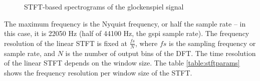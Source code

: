 \documentclass[letter,12pt]{article}
\begin{document}
\begin{figure}[ht]
	\vspace{-1em}
	\centering
	\hspace{0.35em}
	\hspace{0.35em}
	\caption{STFT-based spectrograms of the glockenspiel signal}
	\label{fig:glockspecs}
\end{figure}

The maximum frequency is the Nyquist frequency, or half the sample rate -- in this case, it is 22050 Hz (half of 44100 Hz, the gspi sample rate). The frequency resolution of the linear STFT is fixed at $\frac{\mathit{fs}}{N}$, where $\mathit{fs}$ is the sampling frequency or sample rate, and $N$ is the number of output bins of the DFT. The time resolution of the linear STFT depends on the window size. The table \ref{table:stftparams} shows the frequency resolution per window size of the STFT.
\end{document}
